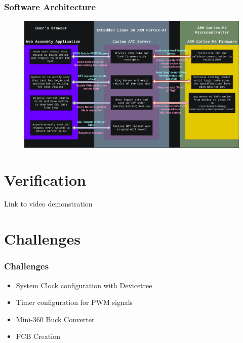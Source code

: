 \documentclass[8pt,compress,aspectratio=169]{beamer}
\begin{document}
\begin{frame}
  \frametitle{Software Architecture}
  \begin{figure}
    \includegraphics[height=0.825\paperheight]{assets/diagrams/software_stack.drawio.png}
  \end{figure}
\end{frame}

\section{Verification}
\begin{frame}
  \begin{block}{Link to video demonstration}
    \href{https://dylxndy.xyz/senior-design-presentation/verification}
    {}
  \end{block}
\end{frame}

\section{Challenges}
\begin{frame}
  \frametitle{Challenges}
  \begin{itemize}
    \item System Clock configuration with Devicetree
    \item Timer configuration for PWM signals
    \item Mini-360 Buck Converter
    \item PCB Creation
  \end{itemize}
\end{frame}
\end{document}
